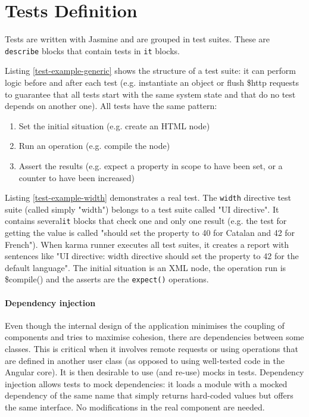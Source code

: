 \section{Tests Definition}
Tests are written with Jasmine and are grouped in test suites.
These are \texttt{describe} blocks that contain tests in \texttt{it} blocks.



Listing \ref{test-example-generic} shows the structure of a test suite:
it can perform logic before and after each test (e.g. instantiate an object or flush \$http requests to guarantee that all tests start with the same system state and that do no test depends on another one).
All tests have the same pattern:
\begin{enumerate}
\item Set the initial situation (e.g. create an \ac{HTML} node)
\item Run an operation (e.g. compile the node)
\item Assert the results (e.g. expect a property in scope to have been set, or a counter to have been increased)
\end{enumerate}



Listing \ref{test-example-width} demonstrates a real test. 
The \texttt{width} directive test suite (called simply "width") belongs to a test suite called "UI directive". 
It contains several\texttt{it} blocks that check one and only one result (e.g. the test for getting the value is called "should set the property to 40 for Catalan and 42 for French").
When karma runner executes all test suites, it creates a report with sentences like "UI directive: width directive should set the property to 42 for the default language".
The initial situation is an \ac{XML} node, the operation run is \$compile() and the asserts are the \texttt{expect()} operations.

\paragraph{Dependency injection} Even though the internal design of the application minimises the coupling of components and tries to maximise cohesion, there are dependencies between some classes.
This is critical when it involves remote requests or using operations that are defined in another user class (as opposed to using well-tested code in the Angular core).
It is then desirable to use (and re-use) mocks in tests.
Dependency injection allows tests to mock dependencies: it loads a module with a mocked dependency of the same name that simply returns hard-coded values but offers the same interface.
No modifications in the real component are needed.

